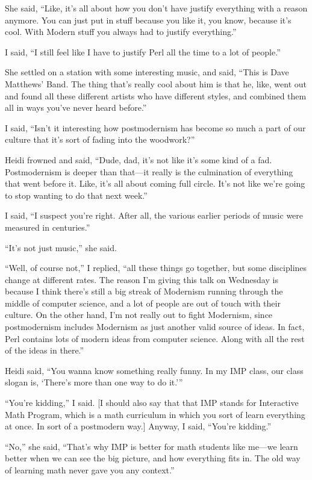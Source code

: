 She said, ``Like, it's all about how you don't have justify everything with
a reason anymore. You can just put in stuff because you like it, you know,
because it's cool. With Modern stuff you always had to justify everything.''

I said, ``I still feel like I have to justify Perl all the time to a lot of
people.''

She settled on a station with some interesting music, and said, ``This is
Dave Matthews' Band. The thing that's really cool about him is that he, like,
went out and found all these different artists who have different styles, and
combined them all in ways you've never heard before.''

I said, ``Isn't it interesting how postmodernism has become so much a part
of our culture that it's sort of fading into the woodwork?''

Heidi frowned and said, ``Dude, dad, it's not like it's some kind of a fad.
Postmodernism is deeper than that---it really is the culmination of everything
that went before it. Like, it's all about coming full circle. It's not like
we're going to stop wanting to do that next week.''

I said, ``I suspect you're right. After all, the various earlier periods of
music were measured in centuries.''

``It's not just music,'' she said.

``Well, of course not,'' I replied, ``all these things go together, but
some disciplines change at different rates. The reason I'm giving this talk
on Wednesday is because I think there's still a big streak of Modernism
running through the middle of computer science, and a lot of people are out
of touch with their culture. On the other hand, I'm not really out to fight
Modernism, since postmodernism includes Modernism as just another valid
source of ideas. In fact, Perl contains lots of modern ideas from computer
science. Along with all the rest of the ideas in there.''

Heidi said, ``You wanna know something really funny. In my IMP class, our
class slogan is, `There's more than one way to do it.'\thinspace''

``You're kidding,'' I said. [I should also say that that IMP stands for
Interactive Math Program, which is a math curriculum in which you sort of
learn everything at once. In sort of a postmodern way.] Anyway, I said,
``You're kidding.''

``No,'' she said, ``That's why IMP is better for math students like me---we
learn better when we can see the big picture, and how everything fits in. The
old way of learning math never gave you any context.''


